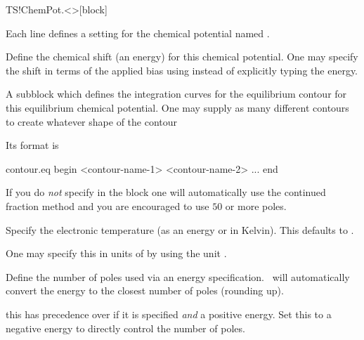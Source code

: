 \begin{fdfentry}{TS!ChemPot.<>}[block]

  Each line defines a setting for the chemical potential named
  \fdf*{<>}.


  \begin{fdfoptions}
    

    Define the chemical shift (an energy) for this chemical
    potential. One may specify the shift in terms of the applied bias
    using  instead of explicitly typing the energy.

    \option[contour.eq]%
    A subblock which defines the integration curves for the
    equilibrium contour for this equilibrium chemical potential. One
    may supply as many different contours to create whatever shape of
    the contour
    
    Its format is
    \begin{fdfexample}
      contour.eq
       begin
        <contour-name-1>
        <contour-name-2>
        ...
       end
    \end{fdfexample}

    \note If you do \emph{not} specify  in the block
    one will automatically use the continued fraction method and you
    are encouraged to use $50$ or more poles\cite{Ozaki2010}.


    Specify the electronic temperature (as an energy or in
    Kelvin). This defaults to .

    One may specify this in units of  by
    using the unit .


    Define the number of poles used via an energy
    specification. \tsiesta\ will automatically convert the energy to
    the closest number of poles (rounding up).
    
    \note this has precedence over
     if it is specified
    \emph{and} a positive energy. Set this to a negative energy to
    directly control the number of poles.


\end{fdfoptions}
\end{fdfentry}
